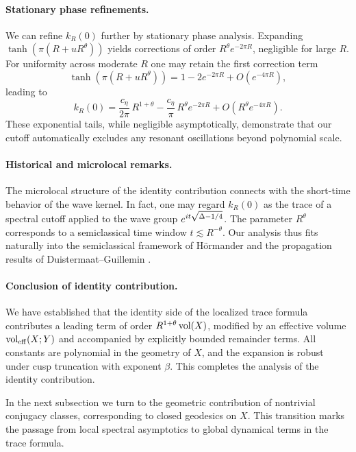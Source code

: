 \paragraph{Stationary phase refinements.}
We can refine $k_R(0)$ further by stationary phase analysis. Expanding $\tanh(\pi(R+uR^\theta))$ yields corrections 
of order $R^\theta e^{-2\pi R}$, negligible for large $R$. For uniformity across moderate $R$ one may retain the 
first correction term
\[
\tanh(\pi(R+uR^\theta)) = 1 - 2e^{-2\pi R} + O(e^{-4\pi R}),
\]
leading to
\[
k_R(0) = \frac{c_\eta}{2\pi}\,R^{1+\theta} - \frac{c_\eta}{\pi}\,R^\theta e^{-2\pi R} + O(R^\theta e^{-4\pi R}).
\]
These exponential tails, while negligible asymptotically, demonstrate that our cutoff automatically excludes any 
resonant oscillations beyond polynomial scale. 

\paragraph{Historical and microlocal remarks.}
The microlocal structure of the identity contribution connects with the short-time behavior of the wave kernel. 
In fact, one may regard $k_R(0)$ as the trace of a spectral cutoff applied to the wave group $e^{it\sqrt{\Delta-1/4}}$. 
The parameter $R^\theta$ corresponds to a semiclassical time window $t\lesssim R^{-\theta}$. Our analysis thus fits 
naturally into the semiclassical framework of Hörmander \cite{hormander1994III} and the propagation results of 
Duistermaat–Guillemin \cite{duistermaatguillemin1975}. 

\paragraph{Conclusion of identity contribution.}
We have established that the identity side of the localized trace formula contributes a leading term of order 
$R^{1+\theta}\operatorname{vol}(X)$, modified by an effective volume $\operatorname{vol}_{\mathrm{eff}}(X;Y)$ and accompanied by explicitly bounded 
remainder terms. All constants are polynomial in the geometry of $X$, and the expansion is robust under cusp truncation 
with exponent $\beta$. This completes the analysis of the identity contribution. 

In the next subsection we turn to the geometric contribution of nontrivial conjugacy classes, corresponding to closed 
geodesics on $X$. This transition marks the passage from local spectral asymptotics to global dynamical terms in the 
trace formula. 

